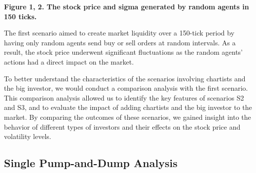 \documentclass[a4paper, 12pt]{article}
\begin{document}
\textbf{Figure 1, 2. The stock price and sigma generated by random agents in 150 ticks.}\par

The first scenario aimed to create market liquidity over a 150-tick period by having only random agents send buy or sell orders at random intervals. As a result, the stock price underwent significant fluctuations as the random agents' actions had a direct impact on the market.\par

To better understand the characteristics of the scenarios involving chartists and the big investor, we would conduct a comparison analysis with the first scenario. This comparison analysis allowed us to identify the key features of scenarios S2 and S3, and to evaluate the impact of adding chartists and the big investor to the market. By comparing the outcomes of these scenarios, we gained insight into the behavior of different types of investors and their effects on the stock price and volatility levels.\par

\vspace{\baselineskip}

\subsection{Single Pump-and-Dump Analysis}
\end{document}
